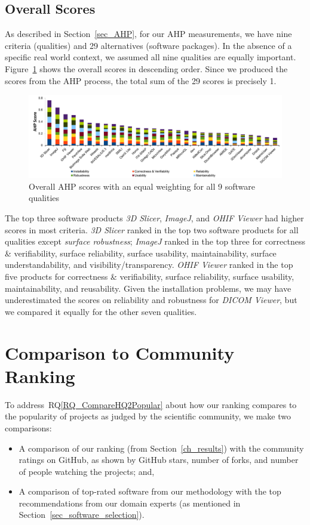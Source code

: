 \documentclass[final, 3p, times, authoryear]{elsarticle}
\newcommand{\rqref}[1]{RQ\ref{#1}}
\begin{document}
\subsection{Overall Scores}

As described in Section~\ref{sec_AHP}, for our AHP measurements, we have nine
criteria (qualities) and 29 alternatives (software packages). In the absence of
a specific real world context, we assumed all nine qualities are equally
important. Figure~\ref{fg_overall_scores} shows the overall scores in descending
order. Since we produced the scores from the AHP process, the total sum of the
29 scores is precisely 1.

\begin{figure}[!ht]
\includegraphics[scale=0.48]{figures/overall_scores.pdf}
\caption{Overall AHP scores with an equal weighting for all 9 software qualities}

\label{fg_overall_scores}
\end{figure}

The top three software products \textit{3D Slicer}, \textit{ImageJ}, and
\textit{OHIF Viewer} had higher scores in most criteria. \textit{3D Slicer}
ranked in the top two software products for all qualities except \textit{surface
robustness}; \textit{ImageJ} ranked in the top three for correctness \&
verifiability, surface reliability, surface usability, maintainability, surface
understandability, and visibility/transparency. \textit{OHIF Viewer} ranked in
the top five products for correctness \& verifiability, surface reliability,
surface usability, maintainability, and reusability. Given the installation
problems, we may have underestimated the scores on reliability and robustness
for \textit{DICOM Viewer}, but we compared it equally for the other seven
qualities.

\section{Comparison to Community Ranking} \label{Sec_VsCommunityRanking}

To address~\rqref{RQ_CompareHQ2Popular} about how our ranking compares to the
popularity of projects as judged by the scientific community, we make two
comparisons:
\begin{itemize}
\item A comparison of our ranking (from Section~\ref{ch_results}) with the
community ratings on GitHub, as shown by GitHub stars, number of forks, and
number of people watching the projects; and,
\item A comparison of top-rated software from our methodology with the top
recommendations from our domain experts (as mentioned in
Section~\ref{sec_software_selection}).
\end{itemize}
\end{document}
